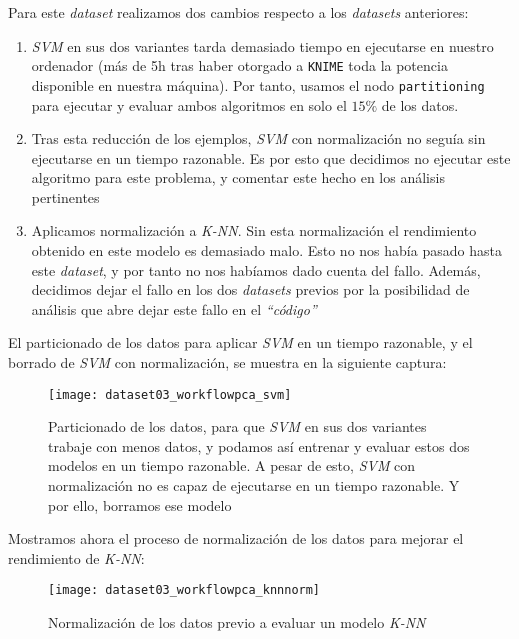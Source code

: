 \documentclass[11pt]{article}
\begin{document}
Para este \emph{dataset} realizamos dos cambios respecto a los \emph{datasets} anteriores:

\begin{enumerate}
    \item \emph{SVM} en sus dos variantes tarda demasiado tiempo en ejecutarse en nuestro ordenador (más de 5h tras haber otorgado a \lstinline{KNIME} toda la potencia disponible en nuestra máquina). Por tanto, usamos el nodo \lstinline{partitioning} para ejecutar y evaluar ambos algoritmos en solo el $15\%$ de los datos.
    \item Tras esta reducción de los ejemplos, \emph{SVM} con normalización no seguía sin ejecutarse en un tiempo razonable. Es por esto que decidimos no ejecutar este algoritmo para este problema, y comentar este hecho en los análisis pertinentes
    \item Aplicamos normalización a \emph{K-NN}. Sin esta normalización el rendimiento obtenido en este modelo es demasiado malo. Esto no nos había pasado hasta este \emph{dataset}, y por tanto no nos habíamos dado cuenta del fallo. Además, decidimos dejar el fallo en los dos \emph{datasets} previos por la posibilidad de análisis que abre dejar este fallo en el \emph{``código''}
\end{enumerate}

El particionado de los datos para aplicar \emph{SVM} en un tiempo razonable, y el borrado de \emph{SVM} con normalización, se muestra en la siguiente captura:

\begin{figure}[H]
    \centering
    \texttt{[image: dataset03\_workflowpca\_svm]}
    \caption{Particionado de los datos, para que \emph{SVM} en sus dos variantes trabaje con menos datos, y podamos así entrenar y evaluar estos dos modelos en un tiempo razonable. A pesar de esto, \emph{SVM} con normalización no es capaz de ejecutarse en un tiempo razonable. Y por ello, borramos ese modelo}
\end{figure}

Mostramos ahora el proceso de normalización de los datos para mejorar el rendimiento de \emph{K-NN}:

\begin{figure}[H]
    \centering
    \texttt{[image: dataset03\_workflowpca\_knnnorm]}
    \caption{Normalización de los datos previo a evaluar un modelo \emph{K-NN}}
\end{figure}

\pagebreak
\end{document}
